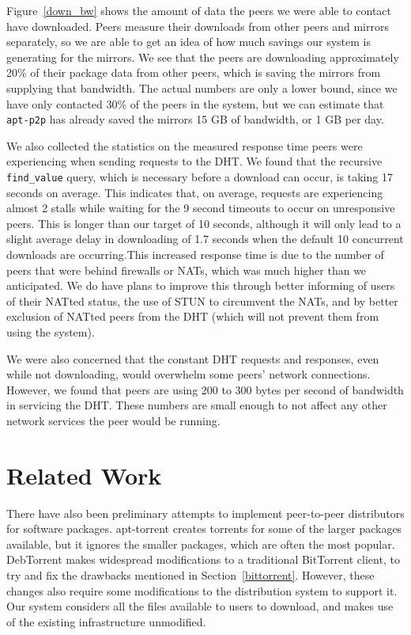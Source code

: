 \documentclass[conference]{IEEEtran}
\begin{document}
Figure~\ref{down_bw} shows the amount of data the peers we were able
to contact have downloaded. Peers measure their downloads from other
peers and mirrors separately, so we are able to get an idea of how
much savings our system is generating for the mirrors. We see that
the peers are downloading approximately 20\% of their package data
from other peers, which is saving the mirrors from supplying that
bandwidth. The actual numbers are only a lower bound, since we have
only contacted 30\% of the peers in the system, but we can estimate
that \texttt{apt-p2p} has already saved the mirrors 15 GB of
bandwidth, or 1 GB per day.

We also collected the statistics on the measured response time peers
were experiencing when sending requests to the DHT. We found that
the recursive \texttt{find\_value} query, which is necessary before
a download can occur, is taking 17 seconds on average. This
indicates that, on average, requests are experiencing almost 2
stalls while waiting for the 9 second timeouts to occur on
unresponsive peers. This is longer than our target of 10 seconds,
although it will only lead to a slight average delay in downloading
of 1.7 seconds when the default 10 concurrent downloads are
occurring.This increased response time is due to the number of peers
that were behind firewalls or NATs, which was much higher than we
anticipated. We do have plans to improve this through better
informing of users of their NATted status, the use of STUN
\cite{STUN} to circumvent the NATs, and by better exclusion of
NATted peers from the DHT (which will not prevent them from using
the system).

We were also concerned that the constant DHT requests and responses,
even while not downloading, would overwhelm some peers' network
connections. However, we found that peers are using 200 to 300 bytes
per second of bandwidth in servicing the DHT. These numbers are
small enough to not affect any other network services the peer would
be running.



\section{Related Work}
\label{related}

There have also been preliminary attempts to implement peer-to-peer distributors for
software packages. apt-torrent \cite{apttorrent} creates torrents
for some of the larger packages available, but it ignores the
smaller packages, which are often the most popular. DebTorrent
\cite{debtorrent} makes widespread modifications to a traditional
BitTorrent client, to try and fix the drawbacks mentioned in
Section~\ref{bittorrent}. However, these changes also require some
modifications to the distribution system to support it. Our system
considers all the files available to users to download, and makes
use of the existing infrastructure unmodified.
\end{document}
